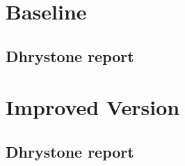 \appendix

\section{Baseline}
\subsection{Dhrystone report}
\label{app:A}


\section{Improved Version}
\subsection{Dhrystone report}

